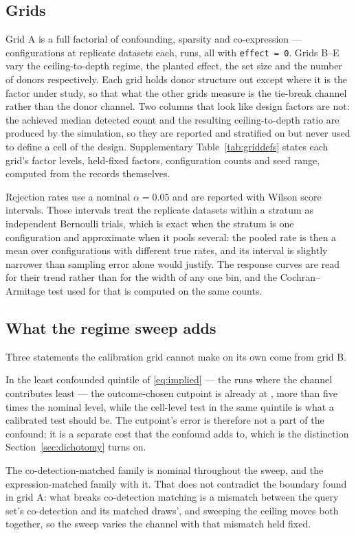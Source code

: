 \documentclass[11pt]{article}
\newcommand{\code}[1]{\texttt{#1}}
\begin{document}
\subsection{Grids}
Grid A is a full factorial of confounding, sparsity and co-expression ---
\gridACells{} configurations at \gridAReplicates{} replicate datasets each,
\gridARuns{} runs, all with \code{effect = 0}. Grids B--E vary the
ceiling-to-depth regime, the planted effect, the set size and the number of
donors respectively. Each grid holds donor structure out except where it is the
factor under study, so that what the other grids measure is the tie-break
channel rather than the donor channel. Two columns that look like design
factors are not: the achieved median detected count and the resulting
ceiling-to-depth ratio are produced by the simulation, so they are reported and
stratified on but never used to define a cell of the design. Supplementary
Table~\ref{tab:griddefs} states each grid's factor levels, held-fixed factors,
configuration counts and seed range, computed from the records themselves.

Rejection rates use a nominal $\alpha=0.05$ and are reported with Wilson score
intervals. Those intervals treat the replicate datasets within a stratum as
independent Bernoulli trials, which is exact when the stratum is one
configuration and approximate when it pools several: the pooled rate is then a
mean over configurations with different true rates, and its interval is
slightly narrower than sampling error alone would justify. The response curves
are read for their trend rather than for the width of any one bin, and the
Cochran--Armitage test used for that is computed on the same counts.

\subsection{What the regime sweep adds}
Three statements the calibration grid cannot make on its own come from grid B.

In the least confounded quintile of \eqref{eq:implied} --- the runs where the
channel contributes least --- the outcome-chosen cutpoint is already at
\gridBCutoptFloor{}, more than five times the nominal level, while the cell-level
test in the same quintile is what a calibrated test should be. The cutpoint's
error is therefore not a part of the confound; it is a separate cost that the
confound adds to, which is the distinction Section~\ref{sec:dichotomy} turns on.

The co-detection-matched family is nominal throughout the sweep, and the
expression-matched family with it. That does not contradict the boundary found
in grid A: what breaks co-detection matching is a mismatch between the query
set's co-detection and its matched draws', and sweeping the ceiling moves both
together, so the sweep varies the channel with that mismatch held fixed.
\end{document}
